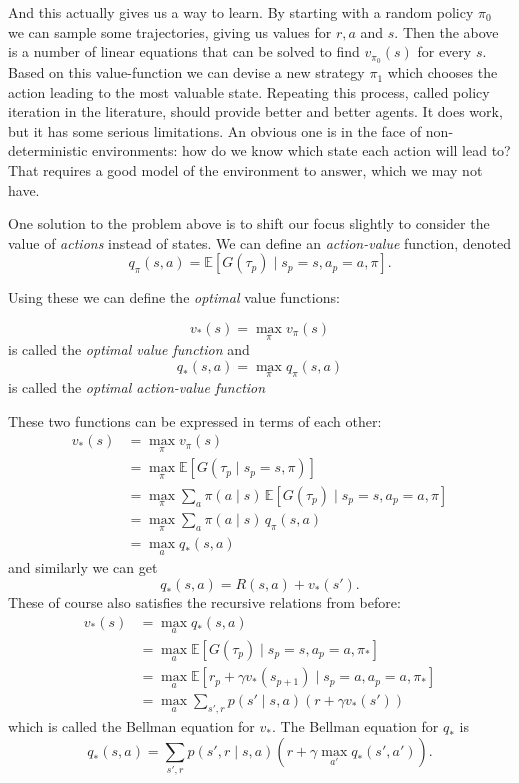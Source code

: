 \documentclass{article}
\theoremstyle{changedot}
\theoremstyle{changedotbreak}
\theoremstyle{nonumberplain}
\newcommand{\m}{\mathbb}
\begin{document}
And this actually gives us a way to learn. By starting with a random policy $\pi_{0}$ we can sample some trajectories, giving us values for $r, a$ and $s$. Then the above is a number of linear equations that can be solved to find $v_{\pi_{0}}(s)$ for every $s$. Based on this value-function we can devise a new strategy $\pi_{1}$ which chooses the action leading to the most valuable state. Repeating this process, called policy iteration in the literature, should provide better and better agents. It does work, but it has some serious limitations. An obvious one is in the face of non-deterministic environments: how do we know which state each action will lead to? That requires a good model of the environment to answer, which we may not have.

One solution to the problem above is to shift our focus slightly to consider the value of \emph{actions} instead of states. We can define an \emph{action-value} function, denoted \[q_{\pi}(s, a) = \m E[G(\tau_{p}) \mid s_{p} = s, a_{p} = a, \pi]. \]

Using these we can define the \emph{optimal} value functions:

\begin{definition}
  \[v_{*}(s) = \max_{\pi} v_{\pi}(s)\] is called the \emph{optimal value function} and \[q_{*}(s, a) = \max_{\pi} q_{\pi}(s, a)\] is called the \emph{optimal action-value function}
\end{definition}

These two functions can be expressed in terms of each other:
\begin{align*}
  v_{*}(s) &= \max_{\pi} v_{\pi}(s) \\
           &= \max_{\pi} \m E[G(\tau_{p} \mid s_{p} = s, \pi)] \\
           &= \max_{\pi} \sum_{a} \pi(a \mid s) \, \m E[G(\tau_{p}) \mid s_{p} = s, a_{p} = a, \pi] \\
           &= \max_{\pi} \sum_{a} \pi(a \mid s) \, q_{\pi} (s, a) \\
  &= \max_{a} q_{*}(s, a)
\end{align*}
and similarly we can get \[q_{*}(s, a) = R(s, a) + v_{*}(s').\] These of course also satisfies the recursive relations from before:
\begin{align*}
  v_{*}(s) &= \max_{a} q_{*}(s, a) \\
           &= \max_{a} \m E[G(\tau_{p}) \mid s_{p} = s, a_{p} = a, \pi_{*}] \\
           &= \max_{a} \m E[r_{p} + \gamma v_{*}(s_{p+1}) \mid s_{p} = a, a_{p} = a, \pi_{*}] \\
           &= \max_{a} \sum_{s', r} p(s' \mid s, a) (r + \gamma v_{*}(s') )
\end{align*}
which is called the Bellman equation for $v_{*}$. The Bellman equation for $q_{*}$ is
\[q_{*}(s, a) = \sum_{s', r} p(s', r \mid s, a) (r + \gamma \max_{a'} q_{*}(s', a')).\]
\end{document}
